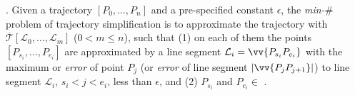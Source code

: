 






. Given a trajectory $[P_0, \dots, P_n]$ and a pre-specified constant $\epsilon$, the \emph{min-$\#$} problem of trajectory simplification is to approximate the trajectory  with $\overline{\mathcal{T}}[\mathcal{L}_0, \ldots , \mathcal{L}_m]$ ($0< m \le n$), such that
(1) on each of them the points $[P_{s_i}, \dots, P_{e_i}]$ are approximated by a line segment $\mathcal{L}_i = \vv{P_{s_i}P_{e_i}}$ with the maximum \ped or \sed \emph{error} of point $P_j$ (or \dad \emph{error} of line segment $|\vv{P_jP_{j+1}}|$) to line segment $\mathcal{L}_i$, $s_i < j<e_i$,  less than $\epsilon$, and
(2) $P_{s_i}$ and $P_{e_i} \in$ .




